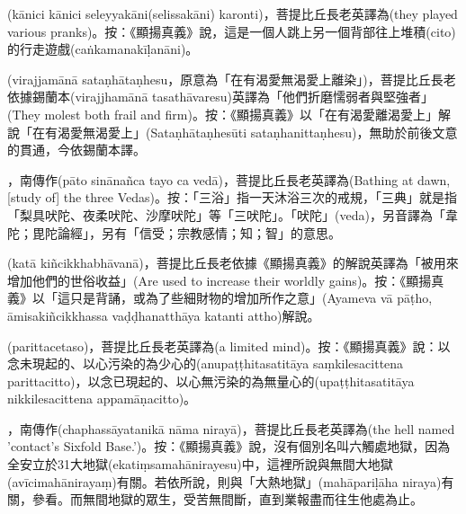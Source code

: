 \startitemgroup[noteitems]
\item{}(kānici kānici seleyyakāni(selissakāni) karonti)，菩提比丘長老英譯為(they played various pranks)。按：《顯揚真義》說，這是一個人跳上另一個背部往上堆積(cito)的行走遊戲(caṅkamanakīḷanāni)。
\stopitemgroup

\startitemgroup[noteitems]
\item{}(virajjamānā sataṇhātaṇhesu，原意為「在有渴愛無渴愛上離染」)，菩提比丘長老依據錫蘭本(virajjhamānā tasathāvaresu)英譯為「他們折磨懦弱者與堅強者」(They molest both frail and firm)。按：《顯揚真義》以「在有渴愛離渴愛上」解說「在有渴愛無渴愛上」(Sataṇhātaṇhesūti sataṇhanittaṇhesu)，無助於前後文意的貫通，今依錫蘭本譯。
\stopitemgroup

\startitemgroup[noteitems]
\item{}，南傳作(pāto sinānañca tayo ca vedā)，菩提比丘長老英譯為(Bathing at dawn, [study of] the three Vedas)。按：「三浴」指一天沐浴三次的戒規，「三典」就是指「梨具吠陀、夜柔吠陀、沙摩吠陀」等「三吠陀」。「吠陀」(veda)，另音譯為「韋陀；毘陀論經」，另有「信受；宗教感情；知；智」的意思。
\stopitemgroup

\startitemgroup[noteitems]
\item{}(katā kiñcikkhabhāvanā)，菩提比丘長老依據《顯揚真義》的解說英譯為「被用來增加他們的世俗收益」(Are used to increase their worldly gains)。按：《顯揚真義》以「這只是背誦，或為了些細財物的增加所作之意」(Ayameva vā pāṭho, āmisakiñcikkhassa vaḍḍhanatthāya katanti attho)解說。
\stopitemgroup

\startitemgroup[noteitems]
\item{}(parittacetaso)，菩提比丘長老英譯為(a limited mind)。按：《顯揚真義》說：以念未現起的、以心污染的為少心的(anupaṭṭhitasatitāya saṃkilesacittena parittacitto)，以念已現起的、以心無污染的為無量心的(upaṭṭhitasatitāya nikkilesacittena appamāṇacitto)。
\stopitemgroup

\startitemgroup[noteitems]
\item{}，南傳作(chaphassāyatanikā nāma nirayā)，菩提比丘長老英譯為(the hell named  'contact's Sixfold Base.')。按：《顯揚真義》說，沒有個別名叫六觸處地獄，因為全安立於31大地獄(ekatiṃsamahānirayesu)中，這裡所說與無間大地獄(avīcimahānirayaṃ)有關。若依所說，則與「大熱地獄」(mahāpariḷāha niraya)有關，參看。而無間地獄的眾生，受苦無間斷，直到業報盡而往生他處為止。
\stopitemgroup

